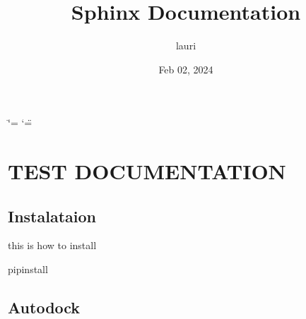 \documentclass[a4paper,10pt,english,openany, oneside]{sphinxmanual}
\title{Sphinx Documentation}
\date{Feb 02, 2024}
\author{lauri}
\begin{document}
\ifdefined\shorthandoff
  \ifnum\catcode`\=\string=\active\shorthandoff{=}\fi
  \ifnum\catcode`\"=\active{}\fi
\fi

\pagestyle{empty}
\sphinxmaketitle
\pagestyle{plain}
\sphinxtableofcontents
\pagestyle{normal}
\label{\detokenize{index::doc}}


\sphinxstepscope


\chapter{TEST DOCUMENTATION}
\label{\detokenize{test:test-documentation}}\label{\detokenize{test::doc}}

\section{Instalataion}
\label{\detokenize{test:instalataion}}\label{\detokenize{test:installation}}
\sphinxAtStartPar
this is how to install

\begin{sphinxVerbatim}[commandchars=\\\{\}]
 pipinstall
\end{sphinxVerbatim}


\section{Autodock}
\label{\detokenize{test:module-test}}\label{\detokenize{test:autodock}}
\end{document}
